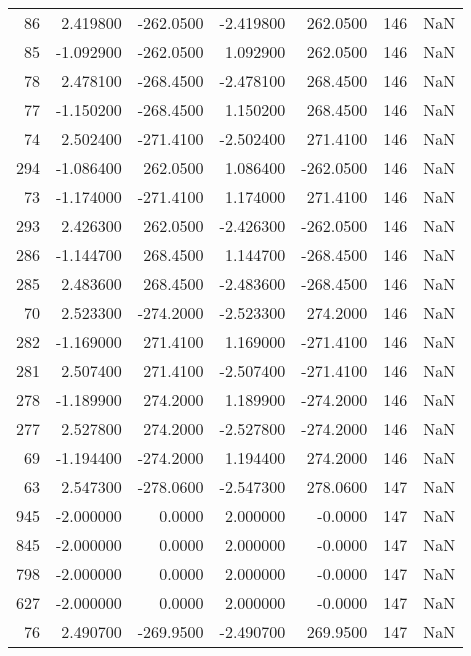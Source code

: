 \begin{tabular}{rrrrrrr}
  86 &    2.419800 & -262.0500 &   -2.419800 &    262.0500 &         146 & NaN \\
  85 &   -1.092900 & -262.0500 &    1.092900 &    262.0500 &         146 & NaN \\
  78 &    2.478100 & -268.4500 &   -2.478100 &    268.4500 &         146 & NaN \\
  77 &   -1.150200 & -268.4500 &    1.150200 &    268.4500 &         146 & NaN \\
  74 &    2.502400 & -271.4100 &   -2.502400 &    271.4100 &         146 & NaN \\
 294 &   -1.086400 &  262.0500 &    1.086400 &   -262.0500 &         146 & NaN \\
  73 &   -1.174000 & -271.4100 &    1.174000 &    271.4100 &         146 & NaN \\
 293 &    2.426300 &  262.0500 &   -2.426300 &   -262.0500 &         146 & NaN \\
 286 &   -1.144700 &  268.4500 &    1.144700 &   -268.4500 &         146 & NaN \\
 285 &    2.483600 &  268.4500 &   -2.483600 &   -268.4500 &         146 & NaN \\
  70 &    2.523300 & -274.2000 &   -2.523300 &    274.2000 &         146 & NaN \\
 282 &   -1.169000 &  271.4100 &    1.169000 &   -271.4100 &         146 & NaN \\
 281 &    2.507400 &  271.4100 &   -2.507400 &   -271.4100 &         146 & NaN \\
 278 &   -1.189900 &  274.2000 &    1.189900 &   -274.2000 &         146 & NaN \\
 277 &    2.527800 &  274.2000 &   -2.527800 &   -274.2000 &         146 & NaN \\
  69 &   -1.194400 & -274.2000 &    1.194400 &    274.2000 &         146 & NaN \\
  63 &    2.547300 & -278.0600 &   -2.547300 &    278.0600 &         147 & NaN \\
 945 &   -2.000000 &    0.0000 &    2.000000 &     -0.0000 &         147 & NaN \\
 845 &   -2.000000 &    0.0000 &    2.000000 &     -0.0000 &         147 & NaN \\
 798 &   -2.000000 &    0.0000 &    2.000000 &     -0.0000 &         147 & NaN \\
 627 &   -2.000000 &    0.0000 &    2.000000 &     -0.0000 &         147 & NaN \\
  76 &    2.490700 & -269.9500 &   -2.490700 &    269.9500 &         147 & NaN \\

\end{tabular}
